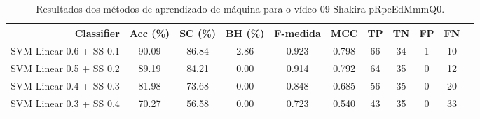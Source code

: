 \begin{table}[!htb]
\centering
\caption{Resultados dos métodos de aprendizado de máquina para o vídeo 09-Shakira-pRpeEdMmmQ0.}
\label{tab:09-Shakira-pRpeEdMmmQ0}
\begin{tabular}{r|c|c|c|c|c|c|c|c|c|c}
\hline\hline
Classifier & Acc (\%) & SC (\%) & BH (\%) & F-medida & MCC & TP & TN & FP & FN \\ \hline
SVM Linear 0.6 + SS 0.1 & 90.09 & 86.84 & 2.86 & 0.923 & 0.798 & 66 & 34 & 1 & 10 \\ 
SVM Linear 0.5 + SS 0.2 & 89.19 & 84.21 & 0.00 & 0.914 & 0.792 & 64 & 35 & 0 & 12 \\ 
SVM Linear 0.4 + SS 0.3 & 81.98 & 73.68 & 0.00 & 0.848 & 0.685 & 56 & 35 & 0 & 20 \\ 
SVM Linear 0.3 + SS 0.4 & 70.27 & 56.58 & 0.00 & 0.723 & 0.540 & 43 & 35 & 0 & 33 \\ 
\hline\hline
\end{tabular}
\end{table}
